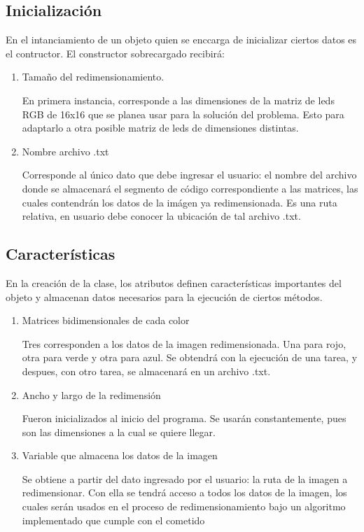 \documentclass{article}
\begin{document}
\subsection{Inicialización} \label{Inicializacion}
En el intanciamiento de un objeto quien se enccarga de inicializar ciertos datos es el contructor. 
El constructor sobrecargado recibirá: 
\begin{enumerate}
  \item Tamaño del redimensionamiento.
  
  En primera instancia, corresponde a las dimensiones de la matriz de leds RGB de 16x16 que se planea usar para la solución del problema.
  Esto para adaptarlo a otra posible matriz de leds de dimensiones distintas. 
  \item Nombre archivo .txt
  
  Corresponde al único dato que debe ingresar el usuario: el nombre del archivo donde se almacenará el segmento de código correspondiente a las matrices, las cuales contendrán los datos de la imágen ya redimensionada. 
  Es una ruta relativa, en usuario debe conocer la ubicación de tal archivo .txt.
  
\end{enumerate}
\subsection{Características} \label{Característica} 
En la creación de la clase, los atributos definen características importantes del objeto y almacenan datos necesarios para la ejecución de ciertos métodos. 

\begin{enumerate}
  \item Matrices bidimensionales de cada color
  
  Tres corresponden a los datos de la imagen redimensionada. 
  Una para rojo, otra para verde y otra para azul. Se obtendrá con la ejecución de una tarea, y despues, con otro tarea, se almacenará en un archivo .txt.
  
  \item Ancho y largo de la redimensión
  
  Fueron inicializados al inicio del programa. Se usarán constantemente, pues son las dimensiones a la cual se quiere llegar.
  
  \item Variable que almacena los datos de la imagen
  
  Se obtiene a partir del dato ingresado por el usuario: la ruta de la imagen a redimensionar. Con ella se tendrá acceso a todos los datos de la imagen, los cuales serán usados en el proceso de redimensionamiento bajo un algoritmo implementado que cumple con el cometido
  
\end{enumerate}
\end{document}
